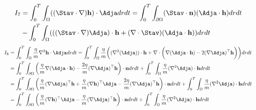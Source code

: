 \begin{align*}
I_7&=\int_0^T \int_\Omega ((\Stav \cdot \nabla)\mathbf{h}) \cdot \Adja dr dt
= \int_0^T \int_{\partial \Omega}(\Stav \cdot \mathbf{n})(\Adja \cdot \mathbf{h})dr dt \\
&- \int_0^T \int_\Omega ( ((\Stav \cdot \nabla)\Adja)\cdot \mathbf{h} +(\nabla \cdot \Stav)(\Adja \cdot \mathbf{h}) )drdt
\end{align*}
\begin{align*}
I_8 &= \int_0^T \int_\Omega \frac{\eta}{m} \nabla^2 \mathbf{h} \cdot \Adja dr dt =
\int_0^T \int_\Omega \frac{\eta}{m} \bigg( ( \nabla^2 (\Adja) ) \cdot \mathbf{h} + \nabla \cdot \bigg( \nabla ( \Adja \cdot \mathbf{h} ) - 2 (\nabla\Adja)^\top \mathbf{h} \bigg) \bigg) dr dt\\
&= \int_0^T \int_{\partial \Omega} \bigg(\frac{\eta}{m}  \nabla ( \Adja \cdot \mathbf{h} ) - \frac{2\eta}{m}  (\nabla \Adja)^\top \mathbf{h} \bigg) \cdot \mathbf{n} dr dt + \int_0^T \int_\Omega\frac{\eta}{m}  ( \nabla^2 \Adja ) \cdot \mathbf{h} dr dt\\
&=\int_0^T \int_{\partial \Omega} \bigg(\frac{\eta}{m} (\nabla \Adja)^\top \mathbf{h} + \frac{\eta}{m}(\nabla \mathbf{h})^\top \Adja - \frac{2\eta}{m}  (\nabla \Adja)^\top \mathbf{h} \bigg) \cdot \mathbf{n} dr dt + \int_0^T \int_\Omega\frac{\eta}{m}  ( \nabla^2 \Adja ) \cdot \mathbf{h} dr dt \\
&=\int_0^T \int_{\partial \Omega} \bigg(\frac{\eta}{m}(\nabla \mathbf{h})^\top \Adja - \frac{\eta}{m}  (\nabla \Adja)^\top \mathbf{h} \bigg) \cdot \mathbf{n} dr dt + \int_0^T \int_\Omega\frac{\eta}{m}  ( \nabla^2 \Adja ) \cdot \mathbf{h} dr dt
\end{align*}

